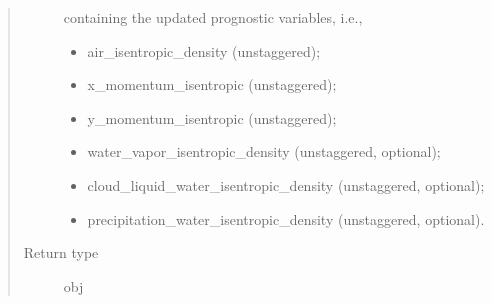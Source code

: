 \documentclass[letterpaper,10pt,english]{sphinxmanual}
\begin{document}
\begin{fulllineitems}
\begin{fulllineitems}
\begin{quote}
\begin{description}
{\hyperref[\detokenize{api:tasmania.storages.state_isentropic.StateIsentropic}]{}} containing the updated prognostic variables, i.e.,
\begin{itemize}
\item {} 
air\_isentropic\_density (unstaggered);

\item {} 
x\_momentum\_isentropic (unstaggered);

\item {} 
y\_momentum\_isentropic (unstaggered);

\item {} 
water\_vapor\_isentropic\_density (unstaggered, optional);

\item {} 
cloud\_liquid\_water\_isentropic\_density (unstaggered, optional);

\item {} 
precipitation\_water\_isentropic\_density (unstaggered, optional).

\end{itemize}


\item[{Return type}] \leavevmode
obj

\end{description}\end{quote}

\end{fulllineitems}


\end{fulllineitems}

\end{document}
